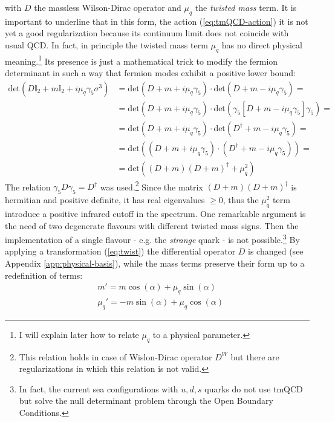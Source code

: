 \documentclass[english, LaM, oneside, noexaminfo]{sapthesis}
\newcommand{\obc}{Open Boundary Conditions}
\begin{document}
with $D$ the massless Wilson-Dirac operator and $\mu_q$ the {\it twisted mass} term.
It is important to underline that in this form, the action (\ref{eq:tmQCD-action}) it is not yet a good regularization because its continuum limit does not coincide with usual QCD.
In fact, in principle the twisted mass term $\mu_q$ has no direct physical meaning.\footnote{I will explain later how to relate $\mu_q$ to a physical parameter.}
Its presence is just a mathematical trick to modify the fermion determinant in such a way that fermion modes exhibit a positive lower bound:
\begin{equation*}
    \begin{aligned}
        \text{det}(D \mathbb{I}_2 + m \mathbb{I}_2 + i\mu_q\gamma_5\sigma^3) 
        & = \text{det}(D + m + i\mu_q\gamma_5) \cdot \text{det}(D + m - i\mu_q\gamma_5) = \\
        & = \text{det}(D + m + i\mu_q\gamma_5) \cdot \text{det}(\gamma_5[D + m - i\mu_q\gamma_5]\gamma_5) = \\
        & = \text{det}(D + m + i\mu_q\gamma_5) \cdot \text{det}(D^\dagger + m - i\mu_q\gamma_5) = \\
        & = \text{det}\left((D + m + i\mu_q\gamma_5)\cdot(D^\dagger + m - i\mu_q\gamma_5)\right) = \\
        & = \text{det}\left((D+m)(D+m)^\dagger + \mu_q^2\right)
    \end{aligned}
\end{equation*}
The relation $\gamma_5 D \gamma_5 = D^\dagger$ was used.\footnote{This relation holds in case of Wislon-Dirac operator $D^W$ but there are regularizations in which this relation is not valid.}
Since the matrix $(D+m)(D+m)^\dagger$ is hermitian and positive definite, it has real eigenvalues $\ge 0$, thus the $\mu_q^2$ term introduce a positive infrared cutoff in the spectrum.
One remarkable argument is the need of two degenerate flavours with different twisted mass signs.
Then the implementation of a single flavour - e.g. the {\it strange} quark - is not possible.\footnote{In fact, the current sea configurations with $u,d,s$ quarks do not use tmQCD but solve the null determinant problem through the \obc.}
\newline
By applying a transformation (\ref{eq:twist}) the differential operator $D$ is changed (see Appendix \ref{app:physical-basis}), while the mass terms preserve their form up to a redefinition of terms:
\begin{equation}\label{eq:new-masses}
    \begin{aligned}
        & m' = m \cos (\alpha) + \mu_q \sin (\alpha) \\
        & \mu_q' = - m \sin (\alpha) + \mu_q \cos (\alpha)
    \end{aligned}
\end{equation}
\end{document}
